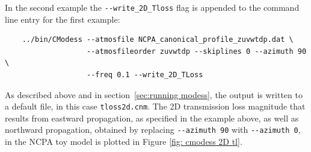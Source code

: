 In the second example the \verb+--write_2D_Tloss+ flag is appended to the command line entry for the first example: 
\begin{verbatim} 
    ../bin/CModess --atmosfile NCPA_canonical_profile_zuvwtdp.dat \ 
                   --atmosfileorder zuvwtdp --skiplines 0 --azimuth 90 \
                   --freq 0.1 --write_2D_TLoss
\end{verbatim}
As described above and in section~\ref{sec:running modess}, the output is written to a default file, in this case \verb+tloss2d.cnm+. The 2D transmission loss magnitude that results from eastward propagation, as specified in the example above, as well as northward propagation, obtained by replacing \verb+--azimuth 90+ with  \verb+--azimuth 0+, in the NCPA toy model is plotted in Figure \ref{fig: cmodess 2D tl}. 

